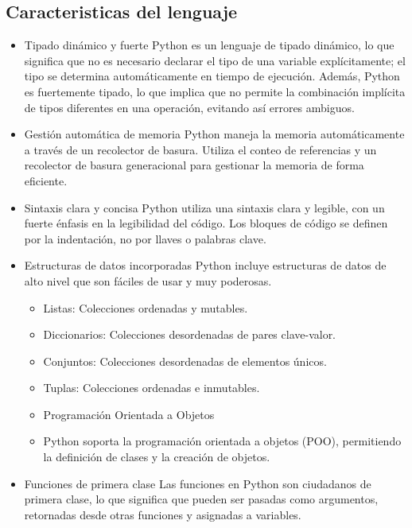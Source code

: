\documentclass[10pt,a4paper]{article}
\begin{document}
\subsection{Caracteristicas del lenguaje}
\begin{itemize}
    \item Tipado dinámico y fuerte
Python es un lenguaje de tipado dinámico, lo que significa que no es necesario declarar el tipo de una variable explícitamente; el tipo se determina automáticamente en tiempo de ejecución. Además, Python es fuertemente tipado, lo que implica que no permite la combinación implícita de tipos diferentes en una operación, evitando así errores ambiguos.

    \item Gestión automática de memoria
Python maneja la memoria automáticamente a través de un recolector de basura. Utiliza el conteo de referencias y un recolector de basura generacional para gestionar la memoria de forma eficiente.

    \item Sintaxis clara y concisa
Python utiliza una sintaxis clara y legible, con un fuerte énfasis en la legibilidad del código. Los bloques de código se definen por la indentación, no por llaves o palabras clave.

    \item Estructuras de datos incorporadas
Python incluye estructuras de datos de alto nivel que son fáciles de usar y muy poderosas.
    \begin{itemize}
        \item  Listas: Colecciones ordenadas y mutables.
    \item  Diccionarios: Colecciones desordenadas de pares clave-valor.
    \item Conjuntos: Colecciones desordenadas de elementos únicos.
    \item Tuplas: Colecciones ordenadas e inmutables.
    \item Programación Orientada a Objetos
   \item  Python soporta la programación orientada a objetos (POO), permitiendo la definición de clases y la creación de objetos.
    \end{itemize}
   

    \item Funciones de primera clase
Las funciones en Python son ciudadanos de primera clase, lo que significa que pueden ser pasadas como argumentos, retornadas desde otras funciones y asignadas a variables.


\end{itemize}
\end{document}
